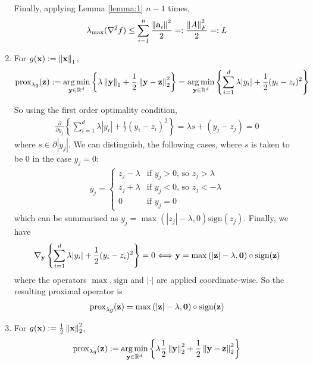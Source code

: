 \documentclass{article}
\begin{document}
\begin{enumerate}[label=1.I.\arabic*]
    Finally, applying Lemma \ref{lemma:1} $n-1$ times,
    \begin{align}
        \lambda_{\max}(\nabla^2 f) \leq \sum_{i=1}^n \frac{\left\lVert\mathbf{a}_i\right\rVert^2}{2} =: \frac{\left\lVert A\right\rVert^2_F}{2}=:L
    \end{align}
    
    \item For $g(\mathbf{x}):=\left\lVert\mathbf{x}\right\rVert_1$,
    \begin{align}
        \text{prox}_{\lambda g}(\mathbf{z}) := \operatorname*{arg\,min}_{\mathbf{y} \in \mathbb{R}^d} \left\lbrace \lambda \left\lVert\mathbf{y}\right\rVert_1 + \frac{1}{2} \left\lVert\mathbf{y} - \mathbf{z}\right\rVert^2_2\right\rbrace = \operatorname*{arg\,min}_{\mathbf{y} \in \mathbb{R}^d} \left\lbrace \sum_{i=1}^d \lambda |y_i| + \frac{1}{2} (y_i-z_i)^2\right\rbrace
    \end{align}
    
    So using the first order optimality condition,
    \begin{align}
       \frac{\partial}{\partial y_j} \left\lbrace \sum_{i=1}^d \lambda |y_i| + \frac{1}{2} (y_i-z_i)^2 \right\rbrace =  \lambda s + (y_j-z_j) = 0
    \end{align}
    where $s \in \partial |y_j |$. We can distinguish, the following cases, where $s$ is taken to be 0 in the case $y_j=0$:
    \begin{align}
        y_j =
        \begin{cases}
            z_j - \lambda &\text{if $y_j>0$, so $z_j > \lambda$} \\
            z_j + \lambda &\text{if $y_j<0$, so $z_j < -\lambda$} \\
            0 &\text{if }y_j=0
        \end{cases}
    \end{align}
    which can be summarised as $y_j = \max{(|z_j|-\lambda, 0)}\text{sign}(z_j)$. Finally, we have
    \begin{align}
         \nabla_{\mathbf{y}} \left\lbrace \sum_{i=1}^d \lambda |y_i| + \frac{1}{2} (y_i-z_i)^2 \right\rbrace = 0 \Longleftrightarrow \mathbf{y} = \max{(|\mathbf{z}|-\lambda, \mathbf{0})}\circ \text{sign}(\mathbf{z})
    \end{align}
    where the operators $\max, \text{sign}$ and $|\cdot|$ are applied coordinate-wise. So the resulting proximal operator is
    \begin{align}
        \text{prox}_{\lambda g}(\mathbf{z}) = \max{(|\mathbf{z}|-\lambda, \mathbf{0})}\circ 
        \text{sign}(\mathbf{z})
    \end{align}
    
    \item For $g(\mathbf{x}):=\frac{1}{2}\left\lVert\mathbf{x}\right\rVert_2^2$,
    \begin{align}
        \text{prox}_{\lambda g}(\mathbf{z}) := \operatorname*{arg\,min}_{\mathbf{y} \in \mathbb{R}^d} \left\lbrace \lambda \frac{1}{2}\left\lVert\mathbf{y}\right\rVert_2^2 + \frac{1}{2} \left\lVert\mathbf{y} - \mathbf{z}\right\rVert^2_2\right\rbrace
    \end{align}
    

\end{enumerate}
\end{document}
